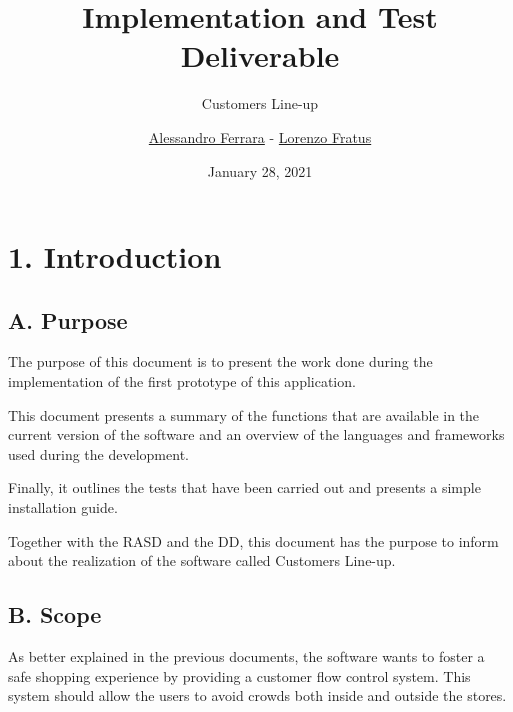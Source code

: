 
\graphicspath{ {assets/} }
\usepackage{dirtree}

\title{Implementation and Test Deliverable}
\subtitle{Customers Line-up}
\author{\href{https://github.com/ferrohd}{Alessandro Ferrara} -
\href{https://github.com/lorenzofratus}{Lorenzo Fratus}}
\date{January 28, 2021}



\maketitle

\tableofcontents

\chapter{1. Introduction}

\section{A. Purpose}

The purpose of this document is to present the work done during the implementation of the first prototype of this application.

This document presents a summary of the functions that are available in the current version of the software and an overview of the languages and frameworks used during the development.

Finally, it outlines the tests that have been carried out and presents a simple installation guide.

Together with the RASD and the DD, this document has the purpose to inform about the realization of the software called Customers Line-up.

\section{B. Scope}

As better explained in the previous documents, the software wants to foster a safe shopping experience by providing a customer flow control system. This system should allow the users to avoid crowds both inside and outside the stores.

